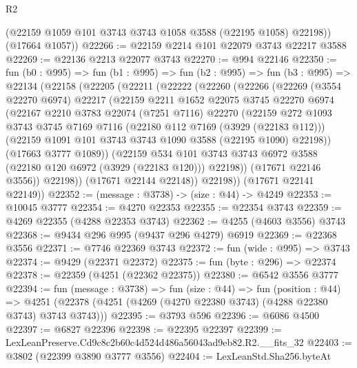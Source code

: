 \begin{lexlean}{R2}
\begin{coremodule}
        (@22159 @1059 @101 @3743 @3743 @1058 @3588 (@22195 @1058) @22198))
      (@17664 @1057))
@22266 := @22159 @2214 @101 @22079 @3743 @22217 @3588
@22269 := @22136 @2213 @22077 @3743
@22270 := @994 @22146
@22350 := fun (b0 : @995) =>
  fun (b1 : @995) =>
  fun (b2 : @995) =>
  fun (b3 : @995) =>
  @22134
    (@22158
      (@22205
        (@22211
          (@22222
            (@22260
              (@22266
                (@22269
                  (@3554 @22270 @6974)
                  @22217
                  (@22159
                    @2211
                    @1652
                    @22075
                    @3745
                    @22270
                    @6974
                    (@22167
                      @2210
                      @3783
                      @22074
                      (@7251 @7116)
                      @22270
                      (@22159
                        @272
                        @1093
                        @3743
                        @3745
                        @7169
                        @7116
                        (@22180 @112 @7169 (@3929 (@22183 @112)))
                        (@22159 @1091 @101 @3743 @3743 @1090 @3588 (@22195 @1090) @22198))
                      (@17663 @3777 @1089))
                    (@22159
                      @534
                      @101
                      @3743
                      @3743
                      @6972
                      @3588
                      (@22180 @120 @6972 (@3929 (@22183 @120)))
                      @22198))
                  (@17671 @22146 @3556))
                @22198))
            (@17671 @22144 @22148))
          @22198))
      (@17671 @22141 @22149))
@22352 := (message : @3738) -> (size : @44) -> @4249
@22353 := @10045 @3777
@22354 := @4270 @22353
@22355 := @22354 @3743
@22359 := @4269 @22355 (@4288 @22353 @3743)
@22362 := @4255 (@4603 @3556) @3743
@22368 := @9434 @296 @995 (@9437 @296 @4279) @6919
@22369 := @22368 @3556
@22371 := @7746 @22369 @3743
@22372 := fun (wide : @995) => @3743
@22374 := @9429 (@22371 @22372)
@22375 := fun (byte : @296) => @22374
@22378 := @22359 (@4251 (@22362 @22375))
@22380 := @6542 @3556 @3777
@22394 := fun (message : @3738) =>
  fun (size : @44) =>
  fun (position : @44) =>
  @4251 (@22378 (@4251 (@4269 (@4270 @22380 @3743) (@4288 @22380 @3743) @3743 @3743)))
@22395 := @3793 @596
@22396 := @6086 @4500
@22397 := @6827 @22396
@22398 := @22395 @22397
@22399 := LexLeanPreserve.Cd9c8c2b60c4d524d486a56043ad9eb82.R2.__fits_32
@22403 := @3802 (@22399 @3890 @3777 @3556)
@22404 := LexLeanStd.Sha256.byteAt

\end{coremodule}
\end{lexlean}
